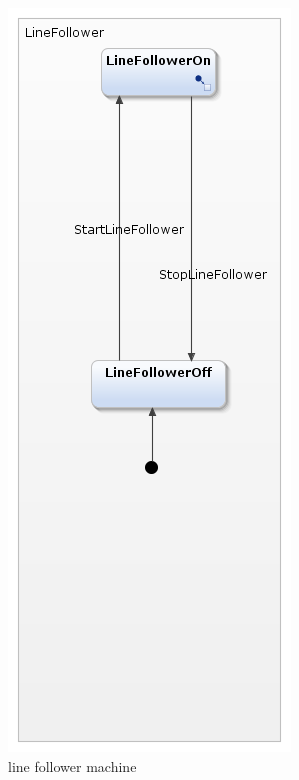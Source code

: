 \documentclass[a4paper,12pt,oneside]{book}
\begin{document}
\begin{itemize}
\begin{figure}[h]
	\includegraphics[scale=.6]{linefollower.png}
	\caption{line follower machine}
\end{figure}



\end{itemize}
\end{document}
